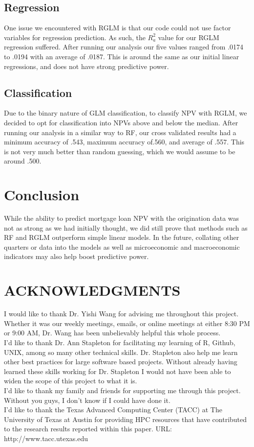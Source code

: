 \documentclass[12 pt]{uncw_thesis}
\theoremstyle{plain}
\theoremstyle{remark}
\theoremstyle{definition}
\begin{document}
\subsection{Regression}
One issue we encountered with RGLM is that our code could not use factor variables for regression prediction. As such, the \(R_a^2\) value for our RGLM regression suffered. After running our analysis our five values ranged from .0174 to .0194 with an average of .0187. This is around the same as our initial linear regressions, and does not have strong predictive power.
\subsection{Classification}
Due to the binary nature of GLM classification, to classify NPV with RGLM, we decided to opt for classification into NPVs above and below the median. After running our analysis in a similar way to RF, our cross validated results had a minimum accuracy of .543, maximum accuracy of.560, and average of .557. This is not very much better than random guessing, which we would assume to be around .500. 
\section{Conclusion}
While the ability to predict mortgage loan NPV with the origination data was not as strong as we had initially thought, we did still prove that methods such as RF and RGLM outperform simple linear models. In the future, collating other quarters or data into the models as well as microeconomic and macroeconomic indicators may also help boost predictive power. 

\newpage
\section*{ACKNOWLEDGMENTS}
I would like to thank Dr. Yishi Wang for advising me throughout this project. Whether it was our weekly meetings, emails, or online meetings at either 8:30 PM or 9:00 AM, Dr. Wang has been unbelievably helpful this whole process. \\
\linebreak
I'd like to thank Dr. Ann  Stapleton for facilitating my learning of R,  Github, UNIX, among so many other technical skills. Dr. Stapleton also help me learn other best practices for large software based projects. Without already having learned these skills working for Dr. Stapleton I would not have been able to widen the scope of this project to what it is.\\
\linebreak 
I'd like to thank my family and friends for supporting me through this project. Without you guys, I don't know if I could have done it.\\
\linebreak
I'd like to thank the Texas Advanced Computing Center (TACC) at The University of Texas at Austin for providing HPC resources that have contributed to the research results reported within this paper. URL: http://www.tacc.utexas.edu
%
\end{document}
